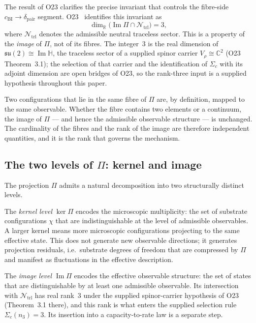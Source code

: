 \documentclass[11pt,a4paper]{article}
\newcommand{\dpair}{\delta_{\mathrm{pair}}}
\newcommand{\Ntrl}{\mathcal{N}_{\mathrm{trl}}}
\newcommand{\ImH}{\operatorname{Im}\mathbb{H}}
\newcommand{\cchi}{c_{\mathrm{BI}}}
\begin{document}
      The result of O23 clarifies the precise invariant that controls the fibre-side
      $\cchi \to \dpair$ segment.
      O23~\cite{Beau2026a27} identifies this invariant as
      \[
        \dim_{\mathbb{R}}\bigl(\operatorname{Im}\Pi \cap \Ntrl\bigr) = 3,
      \]
      where $\Ntrl$ denotes the admissible neutral traceless sector.
      This is a property of the \emph{image} of $\Pi$, not of its fibres.
      The integer~$3$ is the real dimension of $\mathfrak{su}(2) \cong \ImH$, the traceless sector of a
      supplied spinor carrier $V_\rho \cong \mathbb{C}^2$ (O23 Theorem~3.1); the selection of
      that carrier and the identification of $\Sigma_c$ with its adjoint dimension are open
      bridges of O23, so the rank-three input is a supplied hypothesis throughout this paper.

      Two configurations that lie in the same fibre of $\Pi$ are, by definition, mapped to the same
      observable.
      Whether the fibre contains two elements or a continuum, the image of $\Pi$ --- and hence the
      admissible observable structure --- is unchanged.
      The cardinality of the fibres and the rank of the image are therefore independent quantities,
      and it is the rank that governs the mechanism.

    \subsection{The two levels of $\Pi$: kernel and image}
      \label{sec:twolevels}

      The projection $\Pi$ admits a natural decomposition into two structurally distinct levels.

      The \emph{kernel level} $\ker\Pi$ encodes the microscopic multiplicity: the set of substrate
      configurations $\chi$ that are indistinguishable at the level of admissible observables.
      A larger kernel means more microscopic configurations projecting to the same effective state.
      This does not generate new observable directions; it generates projection residuals, i.e.\
      substrate degrees of freedom that are compressed by $\Pi$ and manifest as fluctuations in
      the effective description.

      The \emph{image level} $\operatorname{Im}\Pi$ encodes the effective observable structure: the
      set of states that are distinguishable by at least one admissible observable.
      Its intersection with $\Ntrl$ has real rank~$3$ under the supplied spinor-carrier
      hypothesis of O23 (Theorem~3.1 there), and this rank is what enters the supplied
      selection rule $\Sigma_c(n_3) = 3$.
      Its insertion into a capacity-to-rate law is a separate step.
\end{document}
